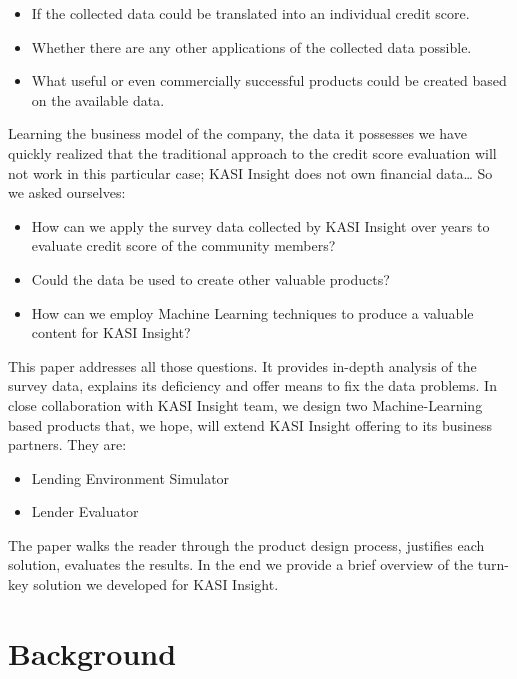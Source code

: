 {\begin{itemize}
\item
  If the collected data could be translated into an individual credit
  score.
\item
  Whether there are any other applications of the collected data
  possible.
\item
  What useful or even commercially successful products could be created
  based on the available data.
\end{itemize}

Learning the business model of the company, the data it possesses we
have quickly realized that the traditional approach to the credit score
evaluation will not work in this particular case; KASI Insight does not
own financial data\ldots{} So we asked ourselves:

\begin{itemize}
\item
  How can we apply the survey data collected by KASI Insight over years
  to evaluate credit score of the community members?
\item
  Could the data be used to create other valuable products?
\item
  How can we employ Machine Learning techniques to produce a valuable
  content for KASI Insight?
\end{itemize}

This paper addresses all those questions. It provides in-depth analysis
of the survey data, explains its deficiency and offer means to fix the
data problems. In close collaboration with KASI Insight team, we design
two Machine-Learning based products that, we hope, will extend KASI
Insight offering to its business partners. They are:

\begin{itemize}
\item
  Lending Environment Simulator
\item
  Lender Evaluator
\end{itemize}

The paper walks the reader through the product design process, justifies
each solution, evaluates the results. In the end we provide a brief
overview of the turn-key solution we developed for KASI Insight.
}


\hypertarget{background}{%
\section{Background}\label{background}}


